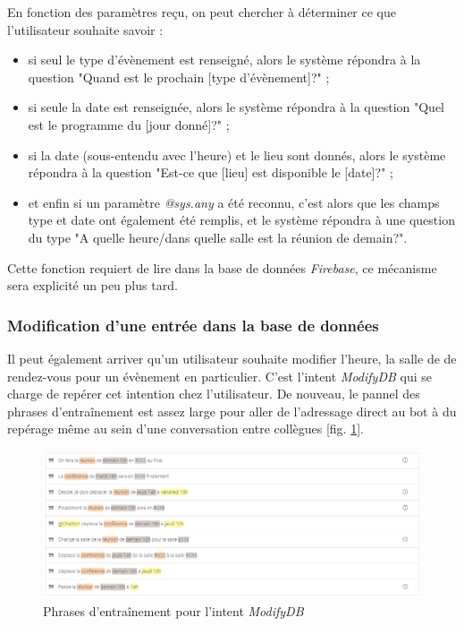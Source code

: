 \documentclass[stage2a]{tnreport} %
\begin{document}
\clearpage

En fonction des paramètres reçu, on peut chercher à déterminer ce que l'utilisateur souhaite savoir : \\
\begin{itemize}
    \item si seul le type d'évènement est renseigné, alors le système répondra à la question "Quand est le prochain [type d'évènement]?" ;
    \item si seule la date est renseignée, alors le système répondra à la question "Quel est le programme du [jour donné]?" ;
    \item si la date (sous-entendu avec l'heure) et le lieu sont donnés, alors le système répondra à la question "Est-ce que [lieu] est disponible le [date]?" ;
    \item et enfin si un paramètre \emph{@sys.any} a été reconnu, c'est alors que les champs type et date ont également été remplis, et le système répondra à une question du type "A quelle heure/dans quelle salle est la réunion de demain?".\\
\end{itemize}

Cette fonction requiert de lire dans la base de données \emph{Firebase}, ce mécanisme sera explicité un peu plus tard.

\subsubsection{Modification d'une entrée dans la base de données}

Il peut également arriver qu'un utilisateur souhaite modifier l'heure, la salle de de rendez-vous pour un évènement en particulier. C'est l'intent \emph{ModifyDB} qui se charge de repérer cet intention chez l'utilisateur. De nouveau, le pannel des phrases d'entraînement est assez large pour aller de l'adressage direct au bot à du repérage même au sein d'une conversation entre collègues [fig. \ref{modify}].\\

\begin{figure}[h!]
    \centering
    \includegraphics[width=\textwidth]{figures/MDBtrain.PNG}
    \caption{Phrases d'entraînement pour l'intent \emph{ModifyDB}}
    \label{modify}
\end{figure}
\end{document}
